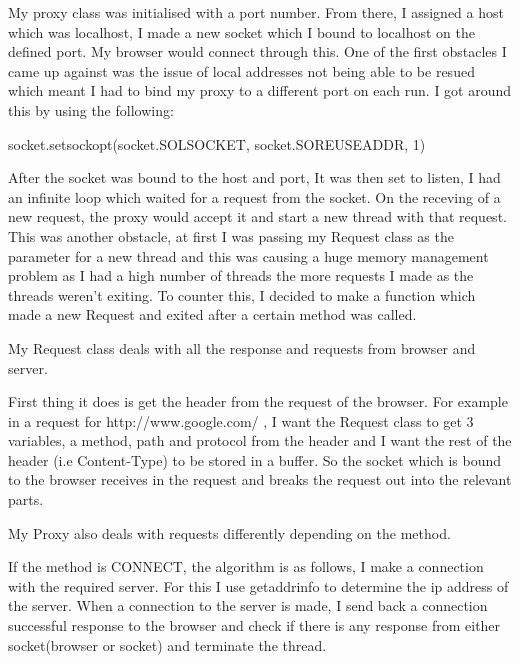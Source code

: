 \documentclass{article}
\begin{document}
My proxy class was initialised with a port number. From there, I assigned a host which was localhost, I made a new socket which I bound to localhost on the defined port. My browser would connect through this. One of the first obstacles I came up against was the issue of local addresses not being able to be resued which meant I had to bind my proxy to a different port on each run. I got around this by using the following:



socket.setsockopt(socket.SOL\textunderscore SOCKET, socket.SO\textunderscore REUSEADDR, 1)



After the socket was bound to the host and port, It was then set to listen, I had an infinite loop which waited for a request from the socket. On the receving of a new request, the proxy would accept it and start a new thread with that request. This was another obstacle, at first I was passing my Request class as the parameter for a new thread and this was causing a huge memory management problem as I had a high number of threads the more requests I made as the threads weren't exiting. To counter this, I decided to make a function which made a new Request and exited after a certain method was called.



My Request class deals with all the response and requests from browser and server.



First thing it does is get the header from the request of the browser. For example in a request for http://www.google.com/ , I want the Request class to get 3 variables, a method, path and protocol from the header and I want the rest of the header (i.e Content-Type) to be stored in a buffer. So the socket which is bound to the browser receives in the request and breaks the request out into the relevant parts.



My Proxy also deals with requests differently depending on the method.



If the method is CONNECT, the algorithm is as follows, I make a connection with the required server. For this I use getaddrinfo to determine the ip address of the server. When a connection to the server is made, I send back a connection successful response to the browser and check if there is any response from either socket(browser or socket) and terminate the thread.
\end{document}
